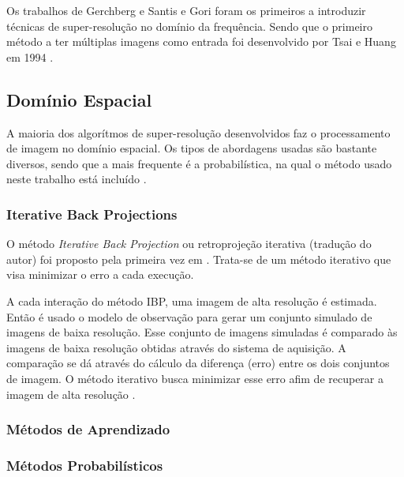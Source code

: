 \documentclass[12pt,openright,oneside,a4paper,english,brazil]{abntex2}
\begin{document}
Os trabalhos de Gerchberg \cite{Gerchberg1974} e Santis e Gori \cite{de1975iterative} foram os primeiros a introduzir técnicas de super-resolução no domínio da frequência.
Sendo que o primeiro método a ter múltiplas imagens como entrada foi desenvolvido por Tsai e Huang em 1994 \cite{nasrollahi2014super}.



\subsection{Domínio Espacial}
A maioria dos algorítmos de super-resolução desenvolvidos faz o processamento de imagem no domínio espacial.
Os tipos de abordagens usadas são bastante diversos, sendo que a mais frequente é a probabilística, na qual o método usado neste trabalho está incluído \cite{nasrollahi2014super}.

\subsubsection{Iterative Back Projections}

O método \emph{Iterative Back Projection} ou retroprojeção iterativa (tradução do autor) foi proposto pela primeira vez em \cite{irani1991improv}.
Trata-se de um método iterativo que visa minimizar o erro a cada execução.


A cada interação do método IBP, uma imagem de alta resolução é estimada.
Então é usado o modelo de observação para gerar um conjunto simulado de imagens de baixa resolução.
Esse conjunto de imagens simuladas é comparado às imagens de baixa resolução obtidas através do sistema de aquisição.
A comparação se dá através do cálculo da diferença (erro) entre os dois conjuntos de imagem.
O método iterativo busca minimizar esse erro afim de recuperar a imagem de alta resolução \cite{park2003super,reis2014metodo}.


\subsubsection{Métodos de Aprendizado}

\subsubsection{Métodos Probabilísticos}
\end{document}
